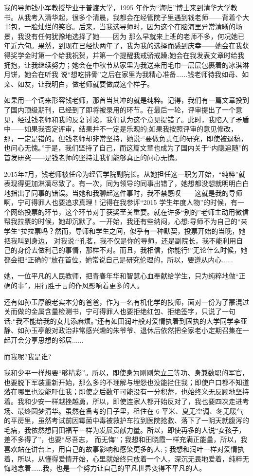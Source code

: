 \documentclass[openany,scheme = chinese, linespread = 1.5]{ctexbook}
\begin{document}
    我的导师钱小军教授毕业于普渡大学，1995 年作为“海归”博士来到清华大学教书。从我考入清华起，很多个清晨，我都会在经管院子里遇到钱老师——背着个大书包，一脸灿烂的笑容。后来，当我选导师时，因为这个在脑海里异常清晰的场景，我没有任何犹豫地选择了她——因为 那么早就来上班的老师不多，何况她已年近六旬。果然，到现在已经快两年了，我为我的选择而感到庆幸——她会在我获得奖学金时第一个给我祝贺，并第一个提醒我戒骄戒躁;她会在我发表文章时给我拥抱，让我继续努力；她会在中秋节从家里为我送来用毛巾一层层包裹着的冰淇淋月饼，她会在听我 说“想吃排骨”之后在家里为我精心准备......钱老师待我如母、如亲、如友，让我明白，做老师就要做成这个样子。 
    
    如果用一个词来形容钱老师，那首当其冲的就是纯粹。记得，我们有一篇文章投到了国内顶级期刊，已经到了即将被录用的环节。在最后一轮，评审提出了一个意见，经过钱老师和我的反复讨论，我们认为这个意见提错了。此时，我陷入了矛盾中——如果我否定评审，结果并不一定是乐观的;如果我按照评审的意见修改，那，一定是错的。但钱老师却非常坚持，她说:“要做负责任的研究，即使被退稿，也问心无愧。”于是，我们坚持了自己，而这篇文章也成为了国内关于“内隐追随”的首发研究——是钱老师的坚持让我们能够真正的问心无愧。
    
    2015年7月，钱老师被任命为经管学院副院长。从她担任这一职务开始，“纯粹”就表现得更加淋漓尽致了。有一次，同为领导的同事出错了，她想都没想就明明白白地指出了同事的错误。当她和我聊起这件事时，我不禁感叹——这就是我的导师啊，宁可得罪人也要追求真理！记得在我参评“2015 学生年度人物”的时候，有一个网络投票的环节，这个环节对于获奖至关重要。就在许多“别的”老师主动用微信帮我拉票的时候，她却沉默了。一开始，我还有些纳闷，心想:导师不为自己的“亲学生”拉拉票吗？然而，导师和学生之间，似乎有一种默契，投票开始的当晚，她把我叫到身边， 对我说:“孔茗，我不仅是你的导师，还是副院长，我不能利用自己的身份去做利己的事情，那样不对。而且，我相信，你能行!”无论什么时候，她都会把“正确的”放在首位，她常说自己是研究伦理的，所以，要遵从内心...... 
    
    她，一位平凡的人民教师，把青春年华和智慧心血奉献给学生，只为纯粹地做“正确的事”，用行胜于言的作风影响着更多的人。 
    
    还有如孙玉厚般老实本分的爸爸，作为一名有机化学的技师，面对一份为了蒙混过关而做的金属含量检测书，宁可得罪人也要拒绝红包、拒绝签字，只说了一句话:“我不能给我的女儿添麻烦。”还有如田润叶般对爱情执着到固执的大学同学李亚静、如孙玉亭般对政治非常感兴趣的朱爷爷、退休后依然把全家老小定期召集在一起开会分享思想的邻居...... 
    
    而我呢?我是谁? 
    
    我和少平一样想要“够精彩”。所以，即使身为刚刚荣立三等功、身兼数职的军官，也要脱下军装重新开始，那么多的不理解与埋怨也没能拦住我；即使户口都不知道落在哪里也没能吓住我；即使之后数年可能没有一分积蓄，也始终义无反顾地坚持着。我和少安一样越挫越勇，所以，即使连家人都开始反对了，我也要四次走进考场、最终圆梦清华。虽然在备考的日子里，租住在 6 平米、夏无空调、冬无暖气的平房里，虽然考试前因霉菌中毒被救护车拉到医院抢救、落下了一阴天就腹泻的毛病，我依然想同田福军一样为发展贡献力量。所以，即使再多的人说“女孩子，差不多得了”，也要“尽吾志， 而无悔”；我想和田晓霞一样充满正能量，所以，我喜欢站在讲台上，用自己的故事影响和感染更多的人;；我想和润叶一样对爱情执着，所以，从懂得爱情开始，心里就始终只放着一个人，深沉无畏地爱着，纯粹无悔地念着......我，也是一个努力让自己的平凡世界变得不平凡的人。 
    
\end{document}
